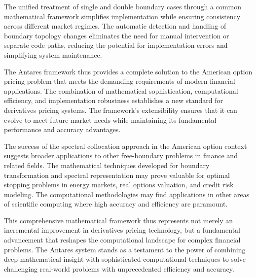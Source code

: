 \documentclass[
  american,
  11pt,
  11pt,
  letterpaper,
  onecolumn]{article}
\begin{document}
The unified treatment of single and double boundary cases through a
common mathematical framework simplifies implementation while ensuring
consistency across different market regimes. The automatic detection and
handling of boundary topology changes eliminates the need for manual
intervention or separate code paths, reducing the potential for
implementation errors and simplifying system maintenance.

The Antares framework thus provides a complete solution to the American
option pricing problem that meets the demanding requirements of modern
financial applications. The combination of mathematical sophistication,
computational efficiency, and implementation robustness establishes a
new standard for derivatives pricing systems. The framework's
extensibility ensures that it can evolve to meet future market needs
while maintaining its fundamental performance and accuracy advantages.

The success of the spectral collocation approach in the American option
context suggests broader applications to other free-boundary problems in
finance and related fields. The mathematical techniques developed for
boundary transformation and spectral representation may prove valuable
for optimal stopping problems in energy markets, real options valuation,
and credit risk modeling. The computational methodologies may find
applications in other areas of scientific computing where high accuracy
and efficiency are paramount.

This comprehensive mathematical framework thus represents not merely an
incremental improvement in derivatives pricing technology, but a
fundamental advancement that reshapes the computational landscape for
complex financial problems. The Antares system stands as a testament to
the power of combining deep mathematical insight with sophisticated
computational techniques to solve challenging real-world problems with
unprecedented efficiency and accuracy.


\printbibliography
\end{document}
